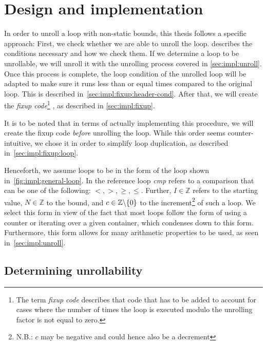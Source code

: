 \chapter{Design and implementation}\label{sec:impl}

In order to unroll a loop with non-static bounds, this thesis follows a specific approach:
First, we check whether we are able to unroll the loop.
 describes the conditions necessary and how we check them.
If we determine a loop to be unrollable, we will unroll it with the unrolling process covered in \cref{sec:impl:unroll}.
Once this process is complete, the loop condition of the unrolled loop will be adapted to make sure it runs less than or equal times compared to the original loop.
This is described in~\cref{sec:impl:fixup:header-cond}.
After that, we will create the \textit{fixup code}\footnote{The term \textit{fixup code} describes that code that has to be added to account for cases where the number of times the loop is executed modulo the unrolling factor is not equal to zero.}
, as described in \cref{sec:impl:fixup}.

It is to be noted that in terms of actually implementing this procedure, we will create the fixup code \textit{before} unrolling the loop.
While this order seems counter-intuitive, we chose it in order to simplify loop duplication, as described in~\cref{sec:impl:fixup:loop}.


Henceforth, we assume loops to be in the form of the loop shown in~\cref{fig:impl:general-loop}.
In the reference loop \textit{cmp} refers to a comparison that can be one of the following: $<, >, \geq, \leq$.
Further, $I \in \mathbb{Z}$ refers to the starting value, $N \in \mathbb{Z}$ to the bound, and $c \in \mathbb{Z} \backslash \{0\}$ \label{sec:impl::def-c} to the increment\footnote{N.B.: $c$ may be negative and could hence also be a decrement} of such a loop.
We select this form in view of the fact that most loops follow the form of using a counter or iterating over a given container, which condenses down to this form.
Furthermore, this form allows for many arithmetic properties to be used, as seen in~\cref{sec:impl:unroll}.



\newpage

\section{Determining unrollability}\label{sec:impl:unrollability}


